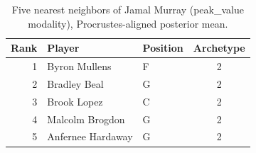 \begin{table}[htbp]
  \centering\small
  \begin{tabular}{rllc}
    \toprule
    Rank & Player & Position & Archetype \\
    \midrule
    1 & Byron Mullens & F & 2 \\
    2 & Bradley Beal & G & 2 \\
    3 & Brook Lopez & C & 2 \\
    4 & Malcolm Brogdon & G & 2 \\
    5 & Anfernee Hardaway & G & 2 \\
    \bottomrule
  \end{tabular}
  \caption{Five nearest neighbors of Jamal Murray (peak_value modality), Procrustes-aligned posterior mean.}
  \label{tab:Jamal_Murray_neighbors_peak_value}
\end{table}

